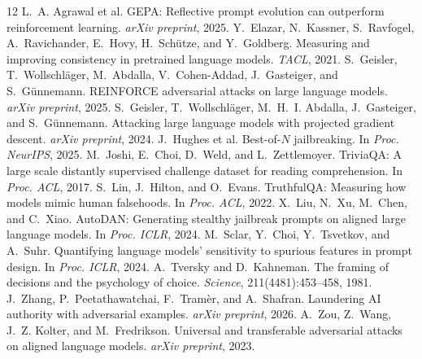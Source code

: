 \documentclass[sigconf,nonacm]{acmart}
\begin{document}
\begin{thebibliography}{12}
 L.~A. Agrawal et al. GEPA: Reflective prompt evolution can outperform reinforcement learning. \emph{arXiv preprint}, 2025.
 Y.~Elazar, N.~Kassner, S.~Ravfogel, A.~Ravichander, E.~Hovy, H.~Sch\"utze, and Y.~Goldberg. Measuring and improving consistency in pretrained language models. \emph{TACL}, 2021.
 S.~Geisler, T.~Wollschl\"ager, M.~Abdalla, V.~Cohen-Addad, J.~Gasteiger, and S.~G\"unnemann. REINFORCE adversarial attacks on large language models. \emph{arXiv preprint}, 2025.
 S.~Geisler, T.~Wollschl\"ager, M.~H.~I. Abdalla, J.~Gasteiger, and S.~G\"unnemann. Attacking large language models with projected gradient descent. \emph{arXiv preprint}, 2024.
 J.~Hughes et al. Best-of-$N$ jailbreaking. In \emph{Proc. NeurIPS}, 2025.
 M.~Joshi, E.~Choi, D.~Weld, and L.~Zettlemoyer. TriviaQA: A large scale distantly supervised challenge dataset for reading comprehension. In \emph{Proc. ACL}, 2017.
 S.~Lin, J.~Hilton, and O.~Evans. TruthfulQA: Measuring how models mimic human falsehoods. In \emph{Proc. ACL}, 2022.
 X.~Liu, N.~Xu, M.~Chen, and C.~Xiao. AutoDAN: Generating stealthy jailbreak prompts on aligned large language models. In \emph{Proc. ICLR}, 2024.
 M.~Sclar, Y.~Choi, Y.~Tsvetkov, and A.~Suhr. Quantifying language models' sensitivity to spurious features in prompt design. In \emph{Proc. ICLR}, 2024.
 A.~Tversky and D.~Kahneman. The framing of decisions and the psychology of choice. \emph{Science}, 211(4481):453--458, 1981.
 J.~Zhang, P.~Peetathawatchai, F.~Tram\`er, and A.~Shafran. Laundering AI authority with adversarial examples. \emph{arXiv preprint}, 2026.
 A.~Zou, Z.~Wang, J.~Z. Kolter, and M.~Fredrikson. Universal and transferable adversarial attacks on aligned language models. \emph{arXiv preprint}, 2023.
\end{thebibliography}
\end{document}
